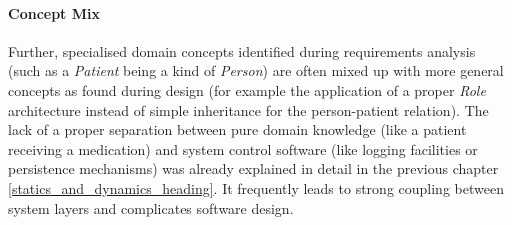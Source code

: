 %
%
%
%
%
%
%

\paragraph{Concept Mix}
\label{concept_mix_heading}

Further, specialised domain concepts identified during requirements analysis
(such as a \emph{Patient} being a kind of \emph{Person}) are often mixed up
with more general concepts as found during design (for example the application
of a proper \emph{Role} architecture instead of simple inheritance for the
person-patient relation). The lack of a proper separation between pure domain
knowledge (like a patient receiving a medication) and system control software
(like logging facilities or persistence mechanisms) was already explained in
detail in the previous chapter \ref{statics_and_dynamics_heading}. It frequently
leads to strong coupling between system layers and complicates software design.
